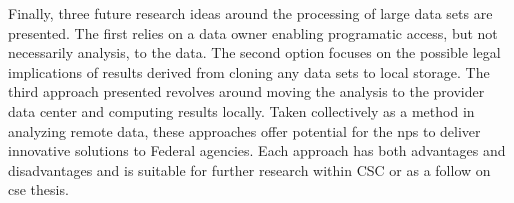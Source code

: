 Finally, three future research ideas around the processing of large data sets are presented. The first relies on a data owner enabling programatic access, but not necessarily analysis, to the data.  The second option focuses on the possible legal implications of results derived from cloning any data sets to local storage. The third approach presented revolves around moving the analysis to the provider data center and computing results locally. Taken collectively as a method in analyzing remote data, these approaches offer potential for the \gls{nps} to deliver innovative solutions to Federal agencies. Each approach has both advantages and disadvantages and is suitable for further research within \textsc{CSC} or as a follow on \gls{cse} thesis.
